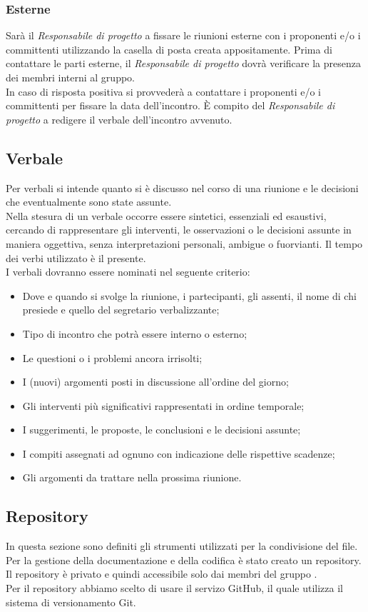 		\subsubsection{Esterne}
Sarà il \textit{Responsabile di progetto} a fissare le riunioni esterne con i proponenti e/o i committenti utilizzando la casella di posta creata appositamente. Prima di contattare le parti esterne, il \textit{Responsabile di progetto} dovrà verificare la presenza dei membri interni al gruppo. \\
In caso di risposta positiva si provvederà a contattare i proponenti e/o i committenti per fissare la data dell'incontro.
È compito del \textit{Responsabile di progetto} a redigere il \gls{verbale} dell'incontro avvenuto.

	\subsection{Verbale}
Per verbali si intende quanto si è discusso nel corso di una riunione e le decisioni che eventualmente sono state assunte. \\
Nella stesura di un verbale occorre essere sintetici, essenziali ed esaustivi, cercando di rappresentare gli interventi, le osservazioni o le decisioni assunte in maniera oggettiva, senza interpretazioni personali, ambigue o fuorvianti. Il tempo dei verbi utilizzato è il presente.\\
I verbali dovranno essere nominati nel seguente criterio: 
\begin{itemize}
	\item Dove e quando si svolge la riunione, i partecipanti, gli assenti, il nome di chi presiede e quello del segretario verbalizzante;
	\item Tipo di incontro che potrà essere interno o esterno;
	\item Le questioni o i problemi ancora irrisolti;
	\item I (nuovi) argomenti posti in discussione all'ordine del giorno;
	\item Gli interventi più significativi rappresentati in ordine temporale; 
	\item I suggerimenti, le proposte, le conclusioni e le decisioni assunte; 
	\item I compiti assegnati ad ognuno con indicazione delle rispettive scadenze; 
	\item Gli argomenti da trattare nella prossima riunione. 
\end{itemize}

	\subsection{Repository}
In questa sezione sono definiti gli strumenti utilizzati per la condivisione del file. \\
Per la gestione della documentazione e della codifica è stato creato un \gls{repository}. Il \gls{repository} è privato e quindi accessibile solo dai membri del gruppo \GRUPPO.\\
Per il \gls{repository} abbiamo scelto di usare il servizo \gls{GitHub}, il quale utilizza il sistema di versionamento \gls{Git}.
